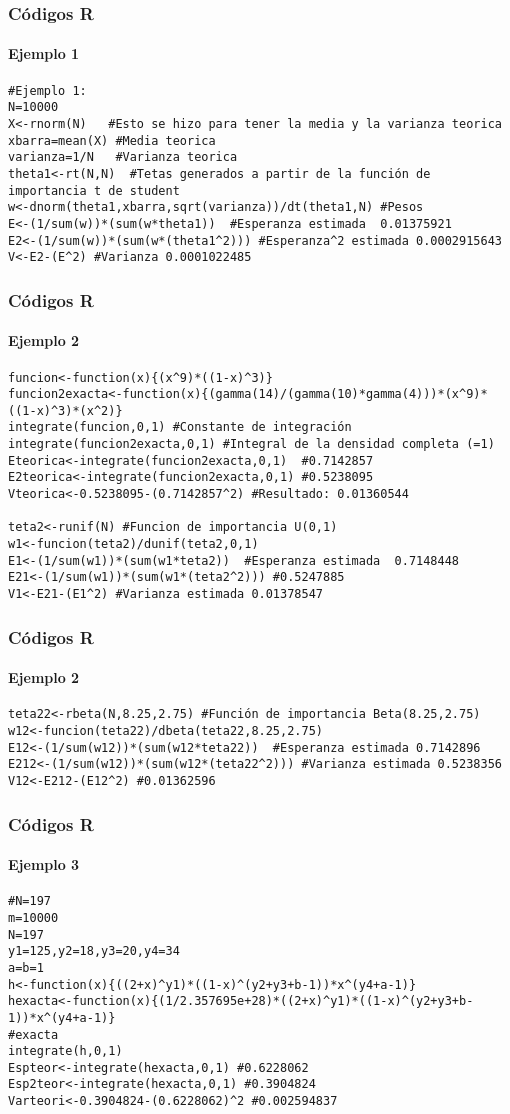 \documentclass[12pt]{beamer}
\begin{document}
\begin{frame}[fragile]
\frametitle{Códigos R}
\framesubtitle{Ejemplo 1}
\begin{verbatim}
#Ejemplo 1:
N=10000
X<-rnorm(N)   #Esto se hizo para tener la media y la varianza teorica
xbarra=mean(X) #Media teorica
varianza=1/N   #Varianza teorica
theta1<-rt(N,N)  #Tetas generados a partir de la función de importancia t de student
w<-dnorm(theta1,xbarra,sqrt(varianza))/dt(theta1,N) #Pesos
E<-(1/sum(w))*(sum(w*theta1))  #Esperanza estimada  0.01375921
E2<-(1/sum(w))*(sum(w*(theta1^2))) #Esperanza^2 estimada 0.0002915643
V<-E2-(E^2) #Varianza 0.0001022485
\end{verbatim}
\end{frame}

\begin{frame}[fragile]
\frametitle{Códigos R}
\framesubtitle{Ejemplo 2}
\begin{verbatim}
funcion<-function(x){(x^9)*((1-x)^3)}
funcion2exacta<-function(x){(gamma(14)/(gamma(10)*gamma(4)))*(x^9)*((1-x)^3)*(x^2)} 
integrate(funcion,0,1) #Constante de integración
integrate(funcion2exacta,0,1) #Integral de la densidad completa (=1)
Eteorica<-integrate(funcion2exacta,0,1)  #0.7142857
E2teorica<-integrate(funcion2exacta,0,1) #0.5238095
Vteorica<-0.5238095-(0.7142857^2) #Resultado: 0.01360544

teta2<-runif(N) #Funcion de importancia U(0,1)
w1<-funcion(teta2)/dunif(teta2,0,1)
E1<-(1/sum(w1))*(sum(w1*teta2))  #Esperanza estimada  0.7148448
E21<-(1/sum(w1))*(sum(w1*(teta2^2))) #0.5247885
V1<-E21-(E1^2) #Varianza estimada 0.01378547
\end{verbatim}
\end{frame}

\begin{frame}[fragile]
\frametitle{Códigos R}
\framesubtitle{Ejemplo 2}
\begin{verbatim}
teta22<-rbeta(N,8.25,2.75) #Función de importancia Beta(8.25,2.75)
w12<-funcion(teta22)/dbeta(teta22,8.25,2.75)
E12<-(1/sum(w12))*(sum(w12*teta22))  #Esperanza estimada 0.7142896
E212<-(1/sum(w12))*(sum(w12*(teta22^2))) #Varianza estimada 0.5238356
V12<-E212-(E12^2) #0.01362596
\end{verbatim}
\end{frame}

\begin{frame}[fragile]
\frametitle{Códigos R}
\framesubtitle{Ejemplo 3}
\begin{verbatim}
#N=197
m=10000
N=197
y1=125,y2=18,y3=20,y4=34
a=b=1
h<-function(x){((2+x)^y1)*((1-x)^(y2+y3+b-1))*x^(y4+a-1)}
hexacta<-function(x){(1/2.357695e+28)*((2+x)^y1)*((1-x)^(y2+y3+b-1))*x^(y4+a-1)}
#exacta
integrate(h,0,1)
Espteor<-integrate(hexacta,0,1) #0.6228062
Esp2teor<-integrate(hexacta,0,1) #0.3904824
Varteori<-0.3904824-(0.6228062)^2 #0.002594837

\end{verbatim}
\end{frame}
\end{document}
